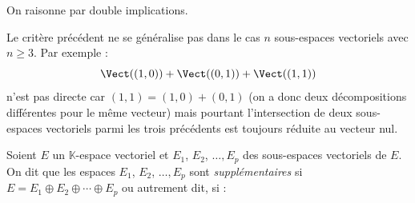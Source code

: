 \documentclass[french,11pt,twoside]{VcCours}
\begin{document}
 \begin{Demonstration}{} On raisonne par double implications.
% 
% 
%

\vspace{8cm}
\end{Demonstration}

\begin{Remarque}{} Le critère précédent ne se généralise pas dans le cas $n$ sous-espaces vectoriels avec $n \geq 3$. Par exemple :
$$ \Vect((1,0)) + \Vect((0,1)) + \Vect((1,1)) $$
n'est pas directe car $(1,1)= (1,0) + (0,1)$ (on a donc deux décompositions différentes pour le même vecteur) mais pourtant l'intersection de deux sous-espaces vectoriels parmi les trois précédents est toujours réduite au vecteur nul.
\end{Remarque}


\begin{Definition}{}
Soient $E$ un $\mathbb{K}$-espace vectoriel et $E_1$, $E_2$, $\ldots, E_p$ des sous-espaces vectoriels de $E$.  On dit que les espaces $E_1$, $E_2$, $\ldots, E_p$ sont \emph{supplémentaires} si $E = E_1 \oplus E_2 \oplus \cdots \oplus E_p$ ou autrement dit, si :
\vspace{1cm}
\end{Definition}
\medskip
\end{document}
